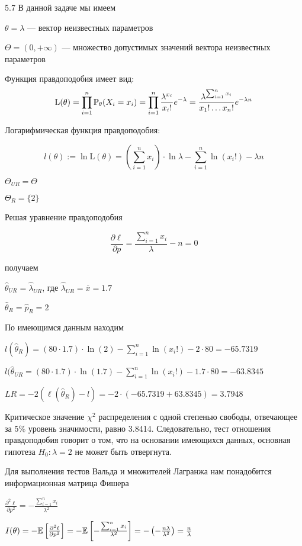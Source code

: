 \begin{solution}{{5.7}}
В данной задаче мы имеем

$\theta = \lambda$ — вектор неизвестных параметров

$\Theta = (0, +\infty)$ — множество допустимых значений вектора неизвестных параметров

Функция правдоподобия имеет вид:
\[\text{L}(\theta) = \prod_{i=1}^n \P_{\theta}(X_i = x_i) = \prod_{i=1}^n \frac{\lambda^{x_i}}{x_i !} e^{-\lambda} = \frac{\lambda^{\sum_{i=1}^n x_i}}{x_1!\ldots x_n!}e^{-\lambda n}\]

Логарифмическая функция правдоподобия:

\[l(\theta) := \ln \text{L}(\theta) = \left( \sum_{i=1}^n x_i \right) \cdot \ln\lambda - \sum_{i=1}^n \ln (x_i!) - \lambda n\]

$\Theta_{UR} = \Theta$

$\Theta_{R} = \{2\}$

Решая уравнение правдоподобия

\[
\frac{\partial \ell}{\partial p} = \frac{\sum_{i=1}^n x_i}{\lambda} - n = 0
\]

получаем

$\hat{\theta}_{UR} = \hat{\lambda}_{UR}$, где $\hat{\lambda}_{UR} = \overline{x} = 1.7$

$\hat{\theta}_{R} = \hat{p}_{R} = 2$

По имеющимся данным находим

$l(\hat{\theta}_{R}) = (80 \cdot 1.7) \cdot \ln(2) - \sum_{i=1}^n \ln (x_i!) - 2 \cdot 80 = -65.7319$

$l(\hat{\theta}_{UR} = (80 \cdot 1.7) \cdot \ln(1.7) - \sum_{i=1}^n \ln (x_i!) - 1.7 \cdot 80 = -63.8345$

$LR = -2(\ell(\hat{\theta}_{R}) - l) = -2 \cdot (-65.7319 + 63.8345) = 3.7948$

Критическое значение $\chi^2$ распределения с одной степенью свободы, отвечающее за 5\% уровень значимости, равно 3.8414. Следовательно, тест отношения правдоподобия говорит о том, что на основании имеющихся данных, основная гипотеза $H_0: \lambda = 2$ не может быть отвергнута.

Для выполнения тестов Вальда и множителей Лагранжа нам понадобится информационная матрица Фишера

$\frac{\partial^2 \ell}{\partial p^2} = - \frac{\sum_{i=1}^n x_i}{\lambda^2}$

$I(\theta) = -\E\left[ \frac{\partial^2 \ell}{\partial p^2} \right] = -\E \left[ - \frac{\sum_{i=1}^n x_i}{\lambda^2} \right] = -\left(-\frac{n\lambda}{\lambda^2}\right) = \frac{n}{\lambda}$


\end{solution}
